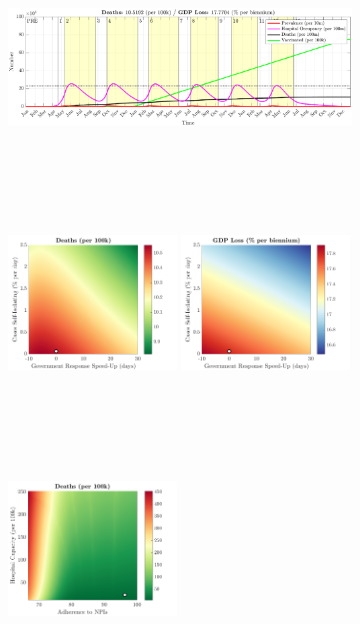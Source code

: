 \documentclass[paper=a4, fontsize=11pt]{scrartcl}
\numberwithin{figure}{section}
\numberwithin{table}{section}
\begin{document}
\begin{figure}[H]
\centering
    \begin{subfigure}[b]{\textwidth}
     	\includegraphics[width=\textwidth,height=5.5cm]{Counterfactuals/IN_sars}
    \end{subfigure}
    \begin{subfigure}[b]{\textwidth}
      	\includegraphics[width=0.49\textwidth,height=6cm]{IN/SARS/ero_d}
	\hspace{0.05cm}
    	\includegraphics[width=0.49\textwidth,height=6cm]{IN/SARS/ero_g}
    \end{subfigure}
    \begin{subfigure}[b]{\textwidth}
      	\includegraphics[width=0.49\textwidth,height=6cm]{IN/SARS/npl_d}

\end{subfigure}
\end{figure}
\end{document}
